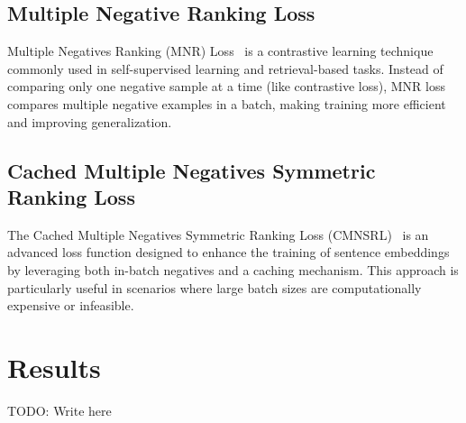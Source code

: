 \documentclass[
	a4paper, %
	10pt, %
	unnumberedsections, %
	twoside, %
]{LTJournalArticle}
\begin{document}
\subsection{Multiple Negative Ranking Loss}
Multiple Negatives Ranking (MNR) Loss~\autocite{mnrl} is a contrastive learning technique commonly used in self-supervised learning and retrieval-based tasks. Instead of comparing only one negative sample at a time (like contrastive loss), MNR loss compares multiple negative examples in a batch, making training more efficient and improving generalization.

\subsection{Cached Multiple Negatives Symmetric Ranking Loss}
The Cached Multiple Negatives Symmetric Ranking Loss (CMNSRL)~\autocite{cmnsrl} is an advanced loss function designed to enhance the training of sentence embeddings by leveraging both in-batch negatives and a caching mechanism. This approach is particularly useful in scenarios where large batch sizes are computationally expensive or infeasible.


\section{Results}

TODO: Write here




\printbibliography %

\end{document}
